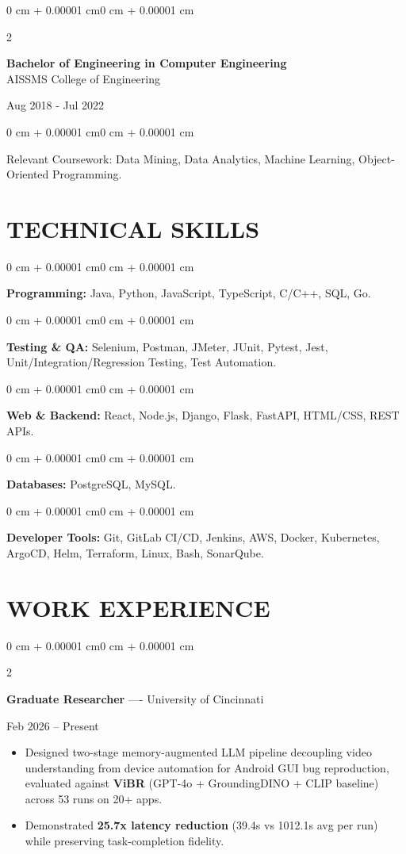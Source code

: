 \documentclass[10pt, letterpaper]{article}
\newenvironment{highlights}{
    \begin{itemize}[
        topsep=0.10 cm,
        parsep=0.06 cm,
        partopsep=0pt,
        itemsep=0.06 cm,
        leftmargin=12pt
    ]
}{
    \end{itemize}
}
\newenvironment{onecolentry}{
    \begin{adjustwidth}{0 cm + 0.00001 cm}{0 cm + 0.00001 cm}
}{
    \end{adjustwidth}
}
\newenvironment{twocolentry}[2][]{
    \onecolentry
    \def\secondColumn{#2}
    \setcolumnwidth{\fill, 4.5 cm}
    \begin{paracol}{2}
}{
    \switchcolumn \raggedleft \secondColumn
    \end{paracol}
    \endonecolentry
}
\begin{document}
\begin{twocolentry}{
    Aug 2018 - Jul 2022
}
    \textbf{Bachelor of Engineering in Computer Engineering} \\
    AISSMS College of Engineering
\end{twocolentry}
\begin{onecolentry}
Relevant Coursework: Data Mining, Data Analytics, Machine Learning, Object-Oriented Programming.
\end{onecolentry}
\section{TECHNICAL SKILLS}
\begin{onecolentry}
\textbf{Programming:} Java, Python, JavaScript, TypeScript, C/C++, SQL, Go.
\end{onecolentry}
\vspace{0.06 cm}
\begin{onecolentry}
\textbf{Testing \& QA:} Selenium, Postman, JMeter, JUnit, Pytest, Jest, Unit/Integration/Regression Testing, Test Automation.
\end{onecolentry}
\vspace{0.06 cm}
\begin{onecolentry}
\textbf{Web \& Backend:} React, Node.js, Django, Flask, FastAPI, HTML/CSS, REST APIs.
\end{onecolentry}
\vspace{0.06 cm}
\begin{onecolentry}
\textbf{Databases:} PostgreSQL, MySQL.
\end{onecolentry}
\vspace{0.06 cm}
\begin{onecolentry}
\textbf{Developer Tools:} Git, GitLab CI/CD, Jenkins, AWS, Docker, Kubernetes, ArgoCD, Helm, Terraform, Linux, Bash, SonarQube.
\end{onecolentry}

\section{WORK EXPERIENCE}
\begin{twocolentry}{Feb 2026 -- Present}
\textbf{Graduate Researcher} ---- University of Cincinnati
\end{twocolentry}
\begin{highlights}
  \item Designed two-stage memory-augmented LLM pipeline decoupling video understanding from device automation for Android GUI bug reproduction, evaluated against \textbf{ViBR} (GPT-4o + GroundingDINO + CLIP baseline) across 53 runs on 20+ apps.
  \item Demonstrated \textbf{25.7x latency reduction} (39.4s vs 1012.1s avg per run) while preserving task-completion fidelity.
\end{highlights}
\end{document}
